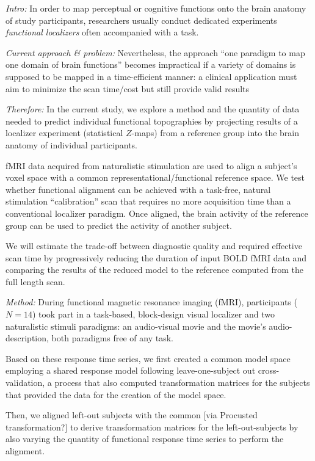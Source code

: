 \textit{Intro:} In order to map perceptual or cognitive functions onto the brain
anatomy of study participants, researchers usually conduct dedicated experiments
\textit{functional localizers} often accompanied with a task.

\textit{Current approach \& problem:} Nevertheless, the approach ``one paradigm
to map one domain of brain functions'' becomes impractical if a variety of
domains is supposed to be mapped in a time-efficient manner:
%
a clinical application must aim to minimize the scan time/cost but still provide
valid results

\textit{Therefore:} In the current study, we explore a method and the quantity
of data needed to predict individual functional topographies by projecting
results of a localizer experiment (statistical $Z$-maps) from a reference group
into the brain anatomy of individual participants.

%
fMRI data acquired from naturalistic stimulation are used to align a subject's
voxel space with a common representational/functional reference space.
%
We test whether functional alignment can be achieved with a task-free, natural
stimulation ``calibration'' scan that requires no more acquisition time than a
conventional localizer paradigm.
%
Once aligned, the brain activity of the reference group can be used to predict
the activity of another subject.

%
We will estimate the trade-off between diagnostic quality and required effective
scan time by progressively reducing the duration of input BOLD fMRI data and
comparing the results of the reduced model to the reference computed from the
full length scan.


\textit{Method:}
During functional magnetic resonance imaging (fMRI), participants ($N=14$) took
part in a task-based, block-design visual localizer and two naturalistic stimuli
paradigms: an audio-visual movie and the movie's audio-description, both
paradigms free of any task.

Based on these response time series, we first created a common model space
employing a shared response model \citep{chen2015reduced} following
leave-one-subject out cross-validation, a process that also computed
transformation matrices for the subjects that provided the data for the creation
of the model space.

Then, we aligned left-out subjects with the common [via Procusted
transformation?] to derive transformation matrices for the left-out-subjects by
also varying the quantity of functional response time series to perform the
alignment.

